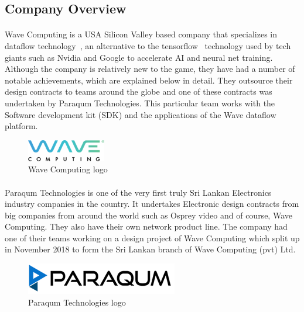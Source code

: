 
\subsection{Company Overview}

\paragraph{}
Wave Computing is a USA Silicon Valley based company that specializes in dataflow technology~\cite{waveintro}, an alternative to the tensorflow~\cite{tflow} technology used by tech giants such as {Nvidia} and {Google} to accelerate {AI} and neural net training. Although the company is relatively new to the game, they have had a number of notable achievements, which are explained below in detail. They outsource their design contracts to teams around the globe and one of these contracts was undertaken by Paraqum Technologies. This particular team works with the Software development kit ({SDK}) and the applications of the Wave dataflow platform.
\begin{figure}[H]
    \centering
    \includegraphics[trim=0cm 0cm 0cm 0cm, clip=true,scale=1]{figures/wave_logo.png}
    \caption{Wave Computing logo\label{Fig:Wave}}\vspace{-4mm}
    \end{figure}


\paragraph{}
Paraqum Technologies is one of the very first truly Sri Lankan Electronics industry companies in the country. It undertakes Electronic design contracts from big companies from around the world such as Osprey video and of course, Wave Computing. They also have their own network product line. The company had one of their teams working on a design project of Wave Computing which split up in November 2018 to form the Sri Lankan branch of Wave Computing (pvt) Ltd. 
\begin{figure}[H]
    \centering
    \includegraphics[trim=0cm 0cm 0cm 0cm, clip=true,scale=1]{figures/pqm_logo.png}
    \caption{Paraqum Technologies logo\label{Fig:Paraqum}}\vspace{-4mm}
    \end{figure}

